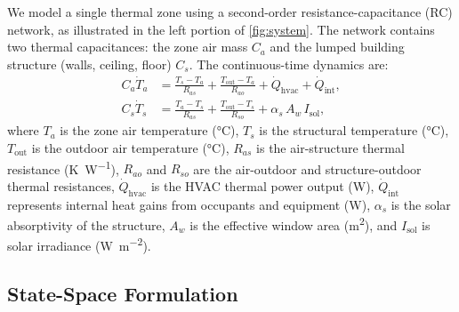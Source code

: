 \documentclass[conference,a4paper]{IEEEtran}[2015/08/26]
\begin{document}
We model a single thermal zone using a second-order resistance-capacitance
(RC) network, as illustrated in the left portion of \cref{fig:system}.
The network contains two thermal capacitances: the zone air mass
$C_a$ and the lumped building structure (walls, ceiling, floor) $C_s$.
The continuous-time dynamics are:
\begin{align}
  C_a \dot{T}_a &= \frac{T_s - T_a}{R_{as}}
                 + \frac{T_{\text{out}} - T_a}{R_{ao}}
                 + \dot{Q}_{\text{hvac}}
                 + \dot{Q}_{\text{int}},
  \label{eq:Ta}\\[4pt]
  C_s \dot{T}_s &= \frac{T_a - T_s}{R_{as}}
                 + \frac{T_{\text{out}} - T_s}{R_{so}}
                 + \alpha_s\, A_w\, I_{\text{sol}},
  \label{eq:Ts}
\end{align}
where $T_a$ is the zone air temperature (\si{\celsius}), $T_s$ is the
structural temperature (\si{\celsius}), $T_{\text{out}}$ is the outdoor
air temperature (\si{\celsius}), $R_{as}$ is the air-structure thermal
resistance (\si{\kelvin\per\watt}), $R_{ao}$ and $R_{so}$ are the
air-outdoor and structure-outdoor thermal resistances, $\dot{Q}_{\text{hvac}}$
is the HVAC thermal power output (\si{\watt}), $\dot{Q}_{\text{int}}$
represents internal heat gains from occupants and equipment (\si{\watt}),
$\alpha_s$ is the solar absorptivity of the structure, $A_w$ is the
effective window area (\si{\metre\squared}), and $I_{\text{sol}}$ is
solar irradiance (\si{\watt\per\metre\squared}).

\subsection{State-Space Formulation}
\end{document}
